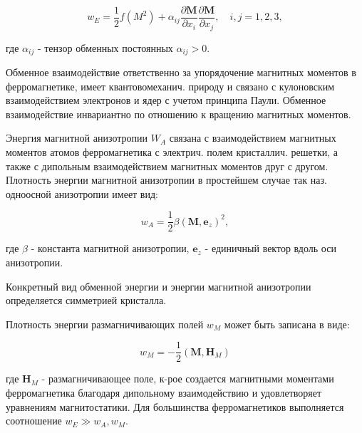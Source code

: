 \documentclass[10pt]{article}
\begin{document}
\[

w_{E}=\frac{1}{2} f\left(M^{2}\right)+\alpha_{i j} \frac{\partial \boldsymbol{M}}{\partial x_{i}} \frac{\partial \boldsymbol{M}}{\partial x_{j}}, \quad i, j=1,2,3,

\]



где $\alpha_{i j}$ - тензор обменных постоянных $\alpha_{i j}>0$.



Обменное взаимодействие ответственно за упорядочение магнитных моментов в ферромагнетике, имеет квантовомеханич. природу и связано с кулоновским взаимодействием электронов и ядер с учетом принципа Паули. Обменное взаимодействие инвариантно по отношению к вращению магнитных моментов.



Энергия магнитной анизотропии $W_{A}$ связана с взаимодействием магнитных моментов атомов ферромагнетика с электрич. полем кристаллич. решетки, а также с дипольным взаимодействием магнитных моментов друг с другом. Плотность энергии магнитной анизотропии в простейшем случае так наз. одноосной анизотропии имеет вид:



\[

w_{A}=\frac{1}{2} \beta\left(\boldsymbol{M}, \boldsymbol{e}_{z}\right)^{2},

\]



где $\beta$ - константа магнитной анизотропии, $\boldsymbol{e}_{z}$ - единичный вектор вдоль оси анизотропии.



Конкретный вид обменной энергии и энергии магнитной анизотропии определяется симметрией кристалла.



Плотность энергии размагничивающих полей $w_{M}$ может быть записана в виде:



\[

w_{M}=-\frac{1}{2}\left(\boldsymbol{M}, \boldsymbol{H}_{M}\right)

\]



где $\boldsymbol{H}_{M}$ - размагничивающее поле, к-рое создается магнитными моментами ферромагнетика благодаря дипольному взаимодействию и удовлетворяет уравнениям магнитостатики. Для большинства ферромагнетиков выполняется соотношение $w_{E} \gg w_{A}, w_{M}$.
\end{document}
